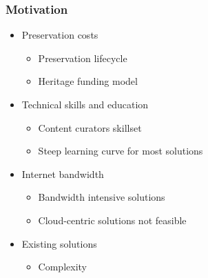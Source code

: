 \documentclass[xcolor=dvitex,t,11pt]{beamer}
\begin{document}
\begin{frame}[fragile]
\frametitle{Motivation}
\begin{itemize}
\item Preservation costs 
\begin{itemize}
\item Preservation lifecycle
\item Heritage funding model
\end{itemize}
\item Technical skills and education
\begin{itemize}
\item Content curators skillset
\item Steep learning curve for most solutions
\end{itemize}
\item Internet bandwidth
\begin{itemize}
\item Bandwidth intensive solutions
\item Cloud-centric solutions not feasible
\end{itemize}
\item Existing solutions
\begin{itemize}
\item Complexity
\end{itemize}
\end{itemize}
\end{frame}

\end{document}
